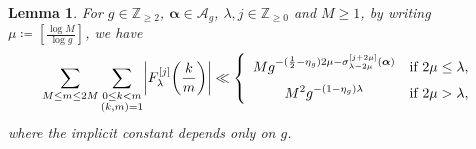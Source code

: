 \documentclass[hidelinks]{amsart}
\numberwithin{equation}{section}
\theoremstyle{plain}
\newtheorem{lemma}{Lemma}
\theoremstyle{definition}
\begin{document}
\begin{lemma}
\label{lem:hybrid_bound}
For $g\in\mathbb{Z}_{\ge2}$, $\bm{\alpha}\in\mathscr{A}_{g}$, $\lambda,j\in\mathbb{Z}_{\ge0}$ and $M\ge1$,
by writing $\mu\coloneqq[\frac{\log M}{\log g}]$,
we have
\[
\sum_{M\le m\le 2M}
\sum_{\substack{
0\le k<m\\
(k,m)=1
}}
\biggl|F_{\lambda}^{[j]}\biggl(\frac{k}{m}\biggr)\biggr|
\ll
\left\{
\begin{array}{>{\displaystyle}cl}
Mg^{-(\frac{1}{2}-\eta_{g})2\mu-\sigma_{\lambda-2\mu}^{[j+2\mu]}(\bm{\alpha})}&\text{if $2\mu\le\lambda$},\\[2mm]
M^{2}g^{-(1-\eta_{g})\lambda}&\text{if $2\mu>\lambda$},
\end{array}
\right.
\]
where the implicit constant depends only on $g$.
\end{lemma}
\end{document}
